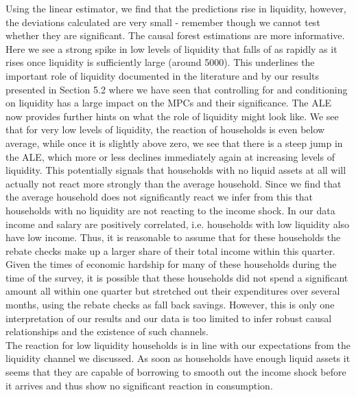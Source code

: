 Using the linear estimator, we find that the predictions rise in liquidity, however, the deviations calculated are very small - remember though we cannot test whether they are significant. The causal forest estimations are more informative. Here we see a strong spike in low levels of liquidity that falls of as rapidly as it rises once liquidity is sufficiently large (around 5000). This underlines the important role of liquidity documented in the literature and by our results presented in Section 5.2 where we have seen that controlling for and conditioning on liquidity has a large impact on the MPCs and their significance. The ALE now provides further hints on what the role of liquidity might look like. We see that for very low levels of liquidity, the reaction of households is even below average, while once it is slightly above zero, we see that there is a steep jump in the ALE, which more or less declines immediately again at increasing levels of liquidity. This potentially signals that households with no liquid assets at all will actually not react more strongly than the average household. Since we find that the average household does not significantly react we infer from this that households with no liquidity are not reacting to the income shock. In our data income and salary are positively correlated, i.e. households with low liquidity also have low income. Thus, it is reasonable to assume that for these households the rebate checks make up a larger share of their total income within this quarter. Given the times of economic hardship for many of these households during the time of the survey, it is possible that these households did not spend a significant amount all within one quarter but stretched out their expenditures over several months, using the rebate checks as fall back savings. However, this is only one interpretation of our results and our data is too limited to infer robust causal relationships and the existence of such channels. \\
The reaction for low liquidity households is in line with our expectations from the liquidity channel we discussed. As soon as households have enough liquid assets it seems that they are capable of borrowing to smooth out the income shock before it arrives and thus show no significant reaction in consumption. \\
